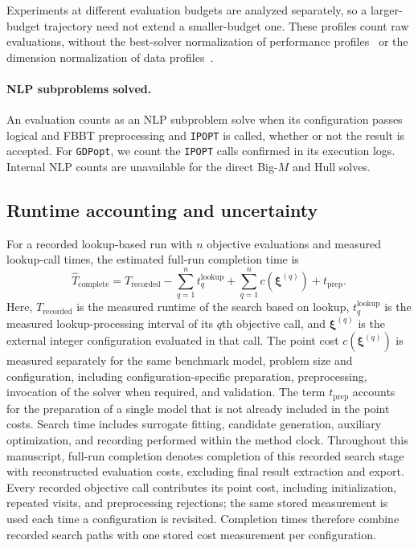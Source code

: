 \documentclass{article}
\begin{document}
Experiments at different evaluation budgets are analyzed separately, so a larger-budget trajectory need not extend a smaller-budget one.
These profiles count raw evaluations, without the best-solver normalization of performance profiles~\citep{dolan2002benchmarking} or the dimension normalization of data profiles~\citep{more2009benchmarking}.

\paragraph{NLP subproblems solved.}
An evaluation counts as an NLP subproblem solve when its configuration passes logical and FBBT preprocessing and \texttt{IPOPT} is called, whether or not the result is accepted.
For \texttt{GDPopt}, we count the \texttt{IPOPT} calls confirmed in its execution logs.
Internal NLP counts are unavailable for the direct Big-\(M\) and Hull solves.

\subsection{Runtime accounting and uncertainty}
\label{sec:cost-accounting}
For a recorded lookup-based run with \(n\) objective evaluations and measured lookup-call times, the estimated full-run completion time is
\begin{equation}\label{eqn:reconstructed-cost}
 \widehat T_{\mathrm{complete}}
 =T_{\mathrm{recorded}}-\sum_{q=1}^{n}t_q^{\mathrm{lookup}}
  +\sum_{q=1}^{n}c(\boldsymbol\xi^{(q)})+t_{\mathrm{prep}}.
\end{equation}
Here, \(T_{\mathrm{recorded}}\) is the measured runtime of the search based on lookup, \(t_q^{\mathrm{lookup}}\) is the measured lookup-processing interval of its \(q\)th objective call, and \(\boldsymbol\xi^{(q)}\) is the external integer configuration evaluated in that call.
The point cost \(c(\boldsymbol\xi^{(q)})\) is measured separately for the same benchmark model, problem size and configuration, including configuration-specific preparation, preprocessing, invocation of the solver when required, and validation.
The term \(t_{\mathrm{prep}}\) accounts for the preparation of a single model that is not already included in the point costs.
Search time includes surrogate fitting, candidate generation, auxiliary optimization, and recording performed within the method clock.
Throughout this manuscript, full-run completion denotes completion of this recorded search stage with reconstructed evaluation costs, excluding final result extraction and export.
Every recorded objective call contributes its point cost, including initialization, repeated visits, and preprocessing rejections; the same stored measurement is used each time a configuration is revisited.
Completion times therefore combine recorded search paths with one stored cost measurement per configuration.
\end{document}
